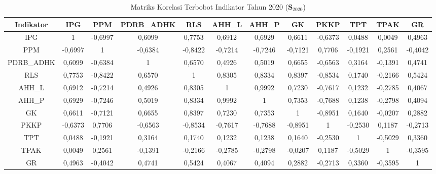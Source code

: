 \begin{table}[H]
\centering
\caption{Matriks Korelasi Terbobot Indikator Tahun 2020 ($\mathbf{S}_{2020}$)} \label{tab:app1matriks_intra_loading_2020}
\begin{adjustbox}{max width=\textwidth, max height=0.85\textheight}
\begin{tabular}{|c|c|c|c|c|c|c|c|c|c|c|c|}
\hline
\textbf{Indikator} & \textbf{IPG} & \textbf{PPM} & \textbf{PDRB\_ADHK} & \textbf{RLS} & \textbf{AHH\_L} & \textbf{AHH\_P} & \textbf{GK} & \textbf{PKKP} & \textbf{TPT} & \textbf{TPAK} & \textbf{GR} \\
\hline
IPG & 1 & -0,6997 & 0,6099 & 0,7753 & 0,6912 & 0,6929 & 0,6611 & -0,6373 & 0,0488 & 0,0049 & 0,4963 \\
PPM & -0,6997 & 1 & -0,6384 & -0,8422 & -0,7214 & -0,7246 & -0,7121 & 0,7706 & -0,1921 & 0,2561 & -0,4042 \\
PDRB\_ADHK & 0,6099 & -0,6384 & 1 & 0,6570 & 0,4926 & 0,5019 & 0,6655 & -0,6563 & 0,3164 & -0,1391 & 0,4741 \\
RLS & 0,7753 & -0,8422 & 0,6570 & 1 & 0,8305 & 0,8334 & 0,8397 & -0,8534 & 0,1740 & -0,2166 & 0,5424 \\
AHH\_L & 0,6912 & -0,7214 & 0,4926 & 0,8305 & 1 & 0,9992 & 0,7230 & -0,7617 & 0,1232 & -0,2785 & 0,4067 \\
AHH\_P & 0,6929 & -0,7246 & 0,5019 & 0,8334 & 0,9992 & 1 & 0,7353 & -0,7688 & 0,1238 & -0,2798 & 0,4094 \\
GK & 0,6611 & -0,7121 & 0,6655 & 0,8397 & 0,7230 & 0,7353 & 1 & -0,8951 & 0,1640 & -0,0207 & 0,2882 \\
PKKP & -0,6373 & 0,7706 & -0,6563 & -0,8534 & -0,7617 & -0,7688 & -0,8951 & 1 & -0,2530 & 0,1187 & -0,2713 \\
TPT & 0,0488 & -0,1921 & 0,3164 & 0,1740 & 0,1232 & 0,1238 & 0,1640 & -0,2530 & 1 & -0,5029 & 0,3360 \\
TPAK & 0,0049 & 0,2561 & -0,1391 & -0,2166 & -0,2785 & -0,2798 & -0,0207 & 0,1187 & -0,5029 & 1 & -0,3595 \\
GR & 0,4963 & -0,4042 & 0,4741 & 0,5424 & 0,4067 & 0,4094 & 0,2882 & -0,2713 & 0,3360 & -0,3595 & 1 \\
\hline
\end{tabular}
\end{adjustbox}
\end{table}